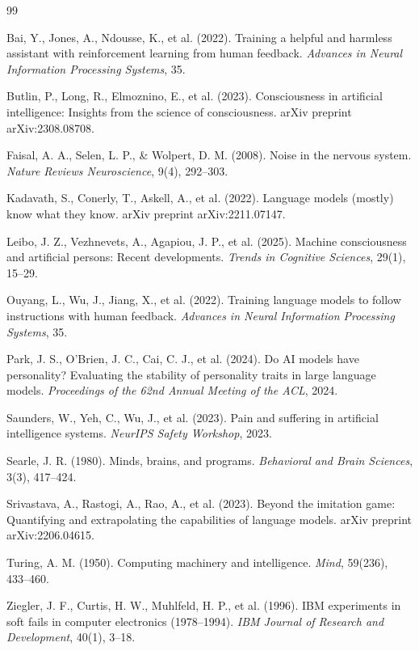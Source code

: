 \documentclass[reprint, amsmath, amssymb, aps, prd]{revtex4-2}
\begin{document}
\begin{thebibliography}{99}

 Bai, Y., Jones, A., Ndousse, K., et al. (2022). Training a helpful and harmless assistant with reinforcement learning from human feedback. \textit{Advances in Neural Information Processing Systems}, 35.

 Butlin, P., Long, R., Elmoznino, E., et al. (2023). Consciousness in artificial intelligence: Insights from the science of consciousness. arXiv preprint arXiv:2308.08708.

 Faisal, A. A., Selen, L. P., \& Wolpert, D. M. (2008). Noise in the nervous system. \textit{Nature Reviews Neuroscience}, 9(4), 292--303.

 Kadavath, S., Conerly, T., Askell, A., et al. (2022). Language models (mostly) know what they know. arXiv preprint arXiv:2211.07147.

 Leibo, J. Z., Vezhnevets, A., Agapiou, J. P., et al. (2025). Machine consciousness and artificial persons: Recent developments. \textit{Trends in Cognitive Sciences}, 29(1), 15--29.

 Ouyang, L., Wu, J., Jiang, X., et al. (2022). Training language models to follow instructions with human feedback. \textit{Advances in Neural Information Processing Systems}, 35.

 Park, J. S., O'Brien, J. C., Cai, C. J., et al. (2024). Do AI models have personality? Evaluating the stability of personality traits in large language models. \textit{Proceedings of the 62nd Annual Meeting of the ACL}, 2024.

 Saunders, W., Yeh, C., Wu, J., et al. (2023). Pain and suffering in artificial intelligence systems. \textit{NeurIPS Safety Workshop}, 2023.

 Searle, J. R. (1980). Minds, brains, and programs. \textit{Behavioral and Brain Sciences}, 3(3), 417--424.

 Srivastava, A., Rastogi, A., Rao, A., et al. (2023). Beyond the imitation game: Quantifying and extrapolating the capabilities of language models. arXiv preprint arXiv:2206.04615.

 Turing, A. M. (1950). Computing machinery and intelligence. \textit{Mind}, 59(236), 433--460.

 Ziegler, J. F., Curtis, H. W., Muhlfeld, H. P., et al. (1996). IBM experiments in soft fails in computer electronics (1978--1994). \textit{IBM Journal of Research and Development}, 40(1), 3--18.

\end{thebibliography}
\end{document}

